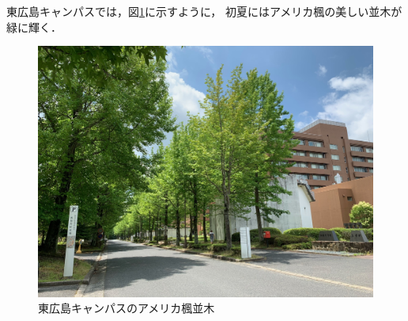 \documentclass[10pt, a4paper, twocolumn]{jarticle}
\begin{document}
東広島キャンパスでは，図\ref{fig:campus}に示すように，
初夏にはアメリカ楓の美しい並木が緑に輝く．
%
\begin{figure}[t]
	\begin{center}
		\includegraphics[width=0.95\hsize]{figure/campus.jpg}
	\end{center}
	\vspace{-12pt} %
	\caption{東広島キャンパスのアメリカ楓並木}
	\label{fig:campus}
\end{figure}
%
\newline
\end{document}
